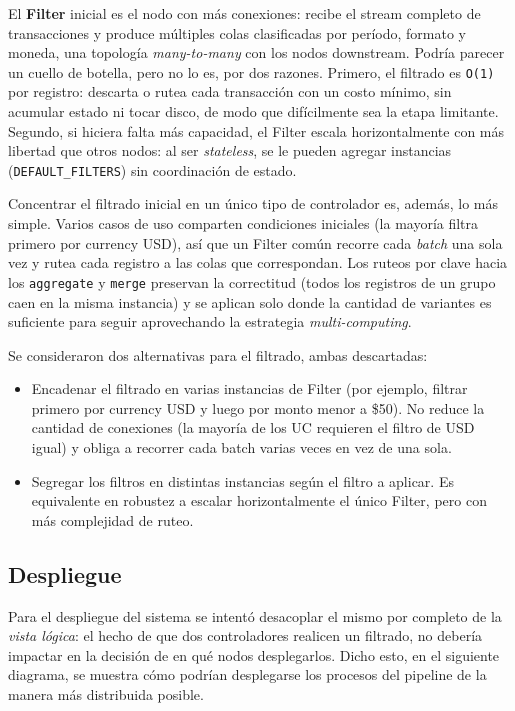 \documentclass[12pt,a4paper]{article}
\begin{document}
El \textbf{Filter} inicial es el nodo con más conexiones: recibe el stream
completo de transacciones y produce múltiples colas clasificadas por
período, formato y moneda, una topología \textit{many-to-many} con los nodos
downstream. Podría parecer un cuello de botella, pero no lo es, por dos
razones. Primero, el filtrado es \texttt{O(1)} por registro: descarta o rutea
cada transacción con un costo mínimo, sin acumular estado ni tocar disco,
de modo que difícilmente sea la etapa limitante. Segundo, si hiciera falta
más capacidad, el Filter escala horizontalmente con más libertad que otros
nodos: al ser \textit{stateless}, se le pueden agregar instancias
(\texttt{DEFAULT\_FILTERS}) sin coordinación de estado.

Concentrar el filtrado inicial en un único tipo de controlador es, además,
lo más simple. Varios casos de uso comparten condiciones iniciales (la
mayoría filtra primero por currency USD), así que un Filter común recorre
cada \textit{batch} una sola vez y rutea cada registro a las colas que
correspondan. Los ruteos por clave hacia los \texttt{aggregate} y
\texttt{merge} preservan la correctitud (todos los registros de un grupo caen
en la misma instancia) y se aplican solo donde la cantidad de variantes es
suficiente para seguir aprovechando la estrategia \textit{multi-computing}.

Se consideraron dos alternativas para el filtrado, ambas descartadas:
\begin{itemize}
    \item Encadenar el filtrado en varias instancias de Filter (por ejemplo,
        filtrar primero por currency USD y luego por monto menor a \$50). No
        reduce la cantidad de conexiones (la mayoría de los UC requieren el
        filtro de USD igual) y obliga a recorrer cada batch varias veces en vez
        de una sola.
    \item Segregar los filtros en distintas instancias según el filtro a
        aplicar. Es equivalente en robustez a escalar horizontalmente el único
        Filter, pero con más complejidad de ruteo.
\end{itemize}

\newpage
\subsection{Despliegue}
Para el despliegue del sistema se intentó desacoplar el mismo por
completo de la \textit{vista lógica}: el hecho de que dos controladores
realicen un filtrado, no debería impactar en la decisión de en qué
nodos desplegarlos.
Dicho esto, en el siguiente diagrama, se muestra cómo podrían
desplegarse los procesos del pipeline de la manera más distribuida posible.
\end{document}
